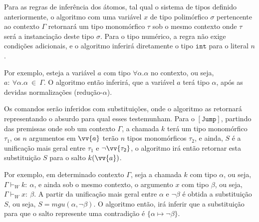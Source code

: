 \begin{prooftree}
\end{prooftree}
Para as regras de inferência dos átomos, tal qual o sistema de tipos definido anteriormente, o algoritmo com uma variável $x$ de tipo polimórfico $\sigma$ pertencente ao contexto $\Gamma$ retornará um tipo monomórfico $\tau$ sob o mesmo contexto onde $\tau$ será a instanciação deste tipo $\sigma$.
Para o tipo numérico, a regra não exige condições adicionais, e o algoritmo inferirá diretamente o tipo $\mathtt{int}$ para o literal $n$.
\begin{prooftree}
\end{prooftree}
Por exemplo, esteja a variável $a$ com tipo $\forall\alpha.\alpha$ no contexto, ou seja, $a{:}\ \forall\alpha.\alpha\ \in\ \Gamma$.
O algoritmo então inferirá, que a variável $a$ terá tipo $\alpha$, após as devidas normalizações (redução-$\alpha$).

Os comandos serão inferidos com substituições, onde o algoritmo as retornará representando o absurdo para qual esses testemunham.
Para o $\mathtt{[Jump]}$, partindo das premissas onde sob um contexto $\Gamma$, a chamada $k$ terá um tipo monomórfico $\tau_1$, os $n$ argumentos em $\vv{a}$ terão $n$ tipos monomórficos $\tau_2$, e ainda, $S$ é a unificação mais geral entre $\tau_1$ e $\neg\vv{\tau_2}$, o algoritmo irá então retornar esta substituição $S$ para o salto $k(\vv{a})$.

\begin{prooftree}
\end{prooftree}
Por exemplo, em determinado contexto $\Gamma$, seja a chamada $k$ com tipo $\alpha$, ou seja, $\Gamma \vdash_W k{:}\ \alpha$, e ainda sob o mesmo contexto, o argumento $x$ com tipo $\beta$, ou seja, $\Gamma \vdash_W x{:}\ \beta$.
A partir da unificação mais geral entre $\alpha$ e $\neg\beta$ é obtida a substituição $S$, ou seja, $S = \mathit{mgu}(\alpha, \neg\beta)$.
O algoritmo então, irá inferir que a substituição para que o salto represente uma contradição é $\{\alpha \mapsto \neg\beta\}$.

